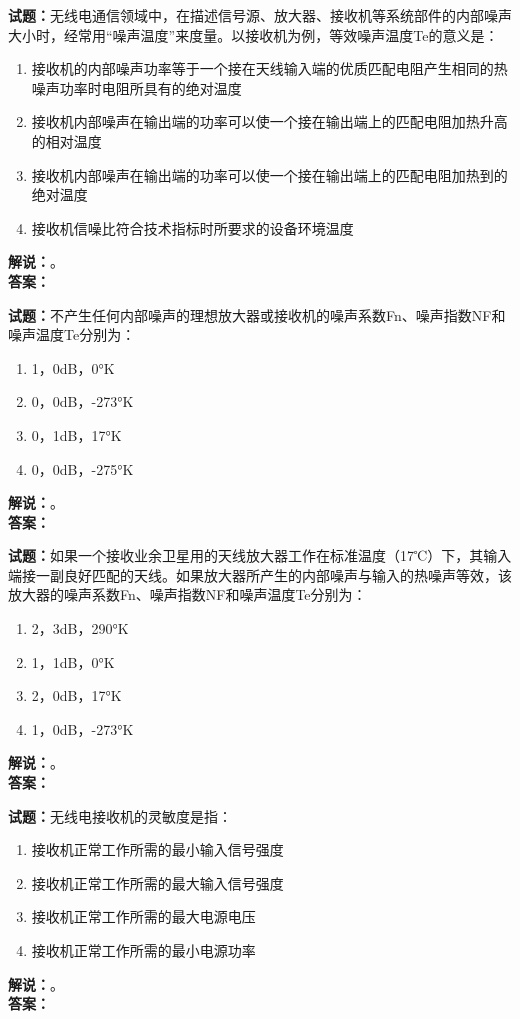 \documentclass{ctexbook}
\begin{document}
\noindent\textbf{试题：}无线电通信领域中，在描述信号源、放大器、接收机等系统部件的内部噪声大小时，经常用“噪声温度”来度量。以接收机为例，等效噪声温度Te的意义是：
\begin{enumerate}[leftmargin=3em]
  \item 接收机的内部噪声功率等于一个接在天线输入端的优质匹配电阻产生相同的热噪声功率时电阻所具有的绝对温度
  \item 接收机内部噪声在输出端的功率可以使一个接在输出端上的匹配电阻加热升高的相对温度
  \item 接收机内部噪声在输出端的功率可以使一个接在输出端上的匹配电阻加热到的绝对温度
  \item 接收机信噪比符合技术指标时所要求的设备环境温度
\end{enumerate}
\noindent\textbf{解说：}\textbf{}。\\\noindent\textbf{答案：}

\bigskip

\noindent\textbf{试题：}不产生任何内部噪声的理想放大器或接收机的噪声系数Fn、噪声指数NF和噪声温度Te分别为：
\begin{enumerate}[leftmargin=3em]
  \item 1，0dB，0°K
  \item 0，0dB，-273°K
  \item 0，1dB，17°K
  \item 0，0dB，-275°K
\end{enumerate}
\noindent\textbf{解说：}\textbf{}。\\\noindent\textbf{答案：}

\bigskip

\noindent\textbf{试题：}如果一个接收业余卫星用的天线放大器工作在标准温度（17℃）下，其输入端接一副良好匹配的天线。如果放大器所产生的内部噪声与输入的热噪声等效，该放大器的噪声系数Fn、噪声指数NF和噪声温度Te分别为：
\begin{enumerate}[leftmargin=3em]
  \item 2，3dB，290°K
  \item 1，1dB，0°K
  \item 2，0dB，17°K
  \item 1，0dB，-273°K
\end{enumerate}
\noindent\textbf{解说：}\textbf{}。\\\noindent\textbf{答案：}

\bigskip

\noindent\textbf{试题：}无线电接收机的灵敏度是指：
\begin{enumerate}[leftmargin=3em]
  \item 接收机正常工作所需的最小输入信号强度
  \item 接收机正常工作所需的最大输入信号强度
  \item 接收机正常工作所需的最大电源电压
  \item 接收机正常工作所需的最小电源功率
\end{enumerate}
\noindent\textbf{解说：}\textbf{}。\\\noindent\textbf{答案：}
\end{document}
